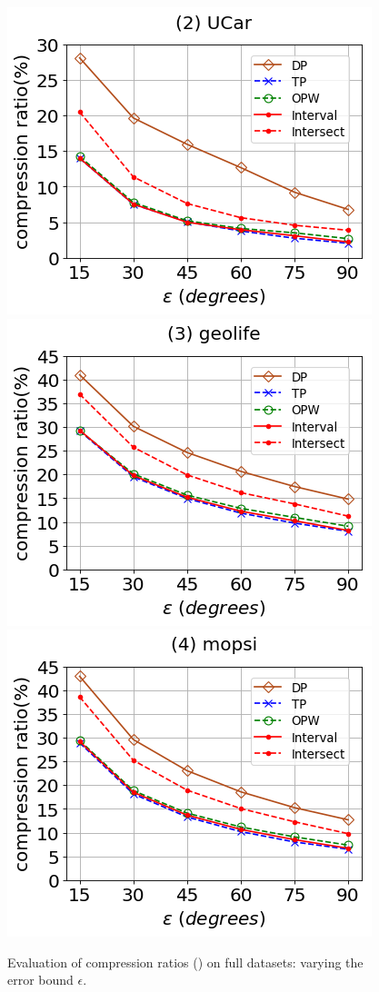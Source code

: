 \begin{figure}[tb!]
	\centering
	\includegraphics[scale=0.320]{Figures/Exp-DAD-CR-epsilon-service.png} 	\hspace{3ex}
	\includegraphics[scale=0.320]{Figures/Exp-DAD-CR-epsilon-geolife.png}	\hspace{3ex}
	\includegraphics[scale=0.320]{Figures/Exp-DAD-CR-epsilon-mopsi.png}		
	\vspace{-2ex}
	\caption{\small Evaluation of compression ratios (\dad) on full datasets: varying the error bound $\epsilon$.}
	\label{fig:cr-dad-epsilon}
	\vspace{-2ex}
\end{figure}
